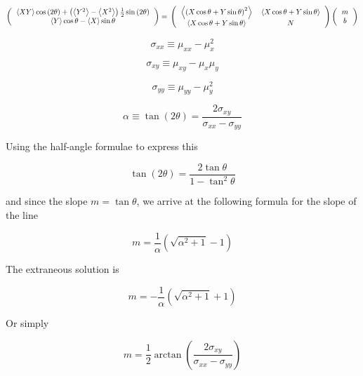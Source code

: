 \documentclass{article}
\newcommand{\meanx}{\ensuremath{\mu_{x}}}
\newcommand{\meanxsquared}{\ensuremath{\mu_{x}^{2}}}
\newcommand{\meany}{\ensuremath{\mu_{y}}}
\newcommand{\meanysquared}{\ensuremath{\mu_{y}^{2}}}
\newcommand{\meanxx}{\ensuremath{\mu_{xx}}}
\newcommand{\meanxy}{\ensuremath{\mu_{xy}}}
\newcommand{\meanyy}{\ensuremath{\mu_{yy}}}
\newcommand{\sxx}{\ensuremath{\sigma_{xx}}}
\newcommand{\sxy}{\ensuremath{\sigma_{xy}}}
\newcommand{\syy}{\ensuremath{\sigma_{yy}}}
\begin{document}
\begin{equation}
\left(
\begin{tabular}{c}
$ \left\langle XY \right\rangle \cos \left( 2 \theta \right) + 
\left( \left\langle Y^{2} \right\rangle - \left\langle X^{2} \right\rangle \right) \frac{1}{2} \sin \left( 2 \theta \right) $ \\
$ \left\langle Y \right\rangle \cos \theta - \left\langle X \right\rangle \sin \theta $
\end{tabular}
\right) = \\
\left(
\begin{tabular}{cc}
$ \left\langle \left( X \cos \theta + Y \sin \theta \right)^{2} \right\rangle $ & $ \left\langle X \cos \theta + Y \sin \theta \right\rangle $ \\
$ \left\langle X \cos \theta + Y \sin \theta \right\rangle $ & $N$ \\
\end{tabular}
\right)
\left(
\begin{tabular}{c}
$m$ \\
$b$
\end{tabular}
\right)
\end{equation}






\begin{equation}
\sxx \equiv \meanxx - {\meanxsquared}
\end{equation}

\begin{equation}
\sxy \equiv \meanxy - \meanx \meany
\end{equation}

\begin{equation}
\syy \equiv \meanyy - \meanysquared
\end{equation}

\begin{equation}
\alpha \equiv \tan \left( 2 \theta \right) = \frac{2 \sxy}{\sxx - \syy}
\end{equation}

Using the half-angle formulae to express this

\begin{equation}
\tan \left( 2 \theta \right) = \frac{2 \tan \theta}{1 - \tan^{2} \theta}
\end{equation}

and since the slope $m = \tan \theta $, we arrive at the following formula for the slope of the line

\begin{equation}
m = \frac{1}{\alpha} \left( \sqrt{\alpha^{2} + 1} - 1\right)
\end{equation}

The extraneous solution is

\begin{equation}
m = - \frac{1}{\alpha} \left( \sqrt{\alpha^{2} + 1} + 1\right)
\end{equation}

Or simply

\begin{equation}
m = \frac{1}{2} \arctan \left( \frac{2 \sxy}{\sxx - \syy} \right)
\end{equation}
\end{document}
